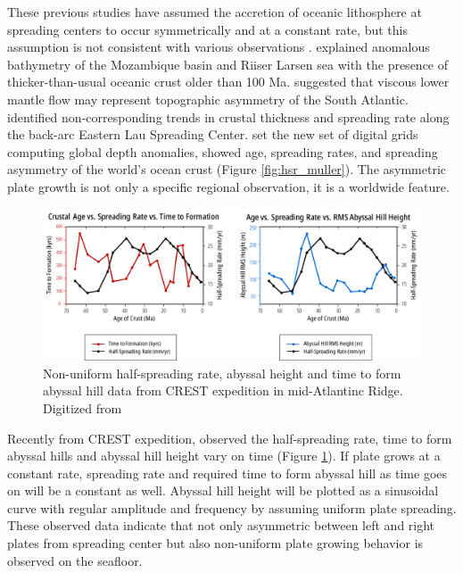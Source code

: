 \documentclass[letterpaper,12pt,notitle]{memphisthesis}                     %
\begin{document}
These previous studies have assumed the accretion of oceanic lithosphere at spreading centers to occur symmetrically and at a constant rate, but this assumption is not consistent with various observations \citep{Castelino2016, Flament2014, Martinez2006, Muller1998, Muller2008, Fedotova2017}. \citet{Castelino2016} explained anomalous bathymetry of the Mozambique basin and Riiser Larsen sea with the presence of thicker-than-usual oceanic crust older than 100 Ma. \citet{Flament2014} suggested that viscous lower mantle flow may represent topographic asymmetry of the South Atlantic. \citet{Martinez2006} identified non-corresponding trends in crustal thickness and spreading rate along the back-arc Eastern Lau Spreading Center. \citet{Muller2008} set the new set of digital grids computing global depth anomalies, showed age, spreading rates, and spreading asymmetry of the world’s ocean crust (Figure \ref{fig:hsr_muller}). The asymmetric plate growth is not only a specific regional observation, it is a worldwide feature.

\begin{figure}[!htb]
	\centering
	\includegraphics[width=0.99\linewidth]{./figs/hsrgraph1.pdf}
	\caption{Non-uniform half-spreading rate, abyssal height and time to form abyssal hill data from CREST expedition in mid-Atlantinc Ridge. Digitized from \citet{Fedotova2017}}
	\label{fig:hsr_fedotova}
\end{figure}

Recently from CREST expedition, \citet{Fedotova2017} observed the half-spreading rate, time to form abyssal hills and abyssal hill height vary on time  (Figure \ref{fig:hsr_fedotova}). %
If plate grows at a constant rate, spreading rate and required time to form abyssal hill as time goes on will be a constant as well. Abyssal hill height will be plotted as a sinusoidal curve with regular amplitude and frequency by assuming uniform plate spreading. These observed data indicate that not only asymmetric between left and right plates from spreading center but also non-uniform plate growing behavior is observed on the seafloor.
\end{document}
